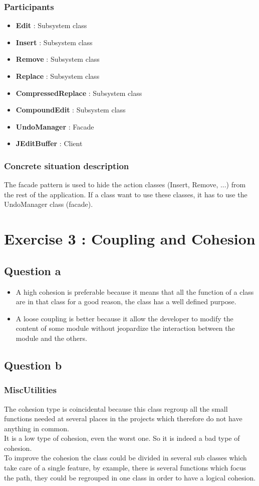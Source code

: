 \documentclass[a4paper,10pt]{article}
\begin{document}
\subsubsection[Participants]{Participants\footnotemark[1]}
\begin{itemize}
 \item \textbf{Edit} : Subsystem class
 \item \textbf{Insert} : Subsystem class
 \item \textbf{Remove} : Subsystem class
 \item \textbf{Replace} : Subsystem class
 \item \textbf{CompressedReplace} : Subsystem class
 \item \textbf{CompoundEdit} : Subsystem class
 \item \textbf{UndoManager} : Facade
 \item \textbf{JEditBuffer} : Client
\end{itemize}

\subsubsection{Concrete situation description}
The facade pattern is used to hide the action classes (Insert, Remove, ...) from the rest of the application. If a class want to use these classes, it has to use the UndoManager class (facade).

\section{Exercise 3 : Coupling and Cohesion}
\subsection{Question a}
\begin{itemize}
\item A high cohesion is preferable because it means that all the function of a class are in that class for a good reason, the class has a well defined purpose.
\item A loose coupling is better because it allow the developer to modify the content of some module without jeopardize the interaction between the module and the others.
\end{itemize}
\subsection{Question b}
\subsubsection{MiscUtilities}
The cohesion type is coincidental because this class regroup all the small functions needed at several places in the projects which therefore do not have anything in common.\\
It is a low type of cohesion, even the worst one. So it is indeed a bad type of cohesion.\\
To improve the cohesion the class could be divided in several sub classes which take care of a single feature, by example, there is several functions which focus the path, they could be regrouped in one class in order to have a logical cohesion.
\end{document}
